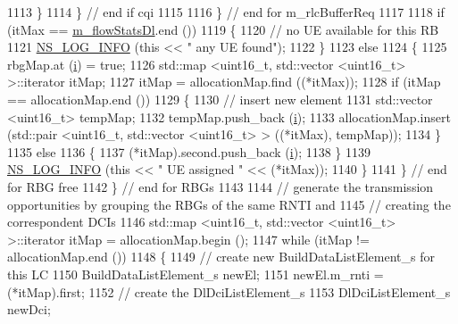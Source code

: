 \begin{DoxyCode}
1113                     \}
1114                 \}   \textcolor{comment}{// end if cqi}
1115               
1116             \} \textcolor{comment}{// end for m\_rlcBufferReq}
1117 
1118           \textcolor{keywordflow}{if} (itMax == \hyperlink{classns3_1_1TtaFfMacScheduler_ad59f8b7a0e70380e5e55053fa07a5ebc}{m\_flowStatsDl}.end ())
1119             \{
1120               \textcolor{comment}{// no UE available for this RB}
1121               \hyperlink{group__logging_gafbd73ee2cf9f26b319f49086d8e860fb}{NS\_LOG\_INFO} (\textcolor{keyword}{this} << \textcolor{stringliteral}{" any UE found"});
1122             \}
1123           \textcolor{keywordflow}{else}
1124             \{
1125               rbgMap.at (\hyperlink{bernuolliDistribution_8m_a6f6ccfcf58b31cb6412107d9d5281426}{i}) = \textcolor{keyword}{true};
1126               std::map <uint16\_t, std::vector <uint16\_t> >::iterator itMap;
1127               itMap = allocationMap.find ((*itMax));
1128               \textcolor{keywordflow}{if} (itMap == allocationMap.end ())
1129                 \{
1130                   \textcolor{comment}{// insert new element}
1131                   std::vector <uint16\_t> tempMap;
1132                   tempMap.push\_back (\hyperlink{bernuolliDistribution_8m_a6f6ccfcf58b31cb6412107d9d5281426}{i});
1133                   allocationMap.insert (std::pair <uint16\_t, std::vector <uint16\_t> > ((*itMax), tempMap));
1134                 \}
1135               \textcolor{keywordflow}{else}
1136                 \{
1137                   (*itMap).second.push\_back (\hyperlink{bernuolliDistribution_8m_a6f6ccfcf58b31cb6412107d9d5281426}{i});
1138                 \}
1139               \hyperlink{group__logging_gafbd73ee2cf9f26b319f49086d8e860fb}{NS\_LOG\_INFO} (\textcolor{keyword}{this} << \textcolor{stringliteral}{" UE assigned "} << (*itMax));
1140             \}
1141         \} \textcolor{comment}{// end for RBG free}
1142     \} \textcolor{comment}{// end for RBGs}
1143 
1144   \textcolor{comment}{// generate the transmission opportunities by grouping the RBGs of the same RNTI and}
1145   \textcolor{comment}{// creating the correspondent DCIs}
1146   std::map <uint16\_t, std::vector <uint16\_t> >::iterator itMap = allocationMap.begin ();
1147   \textcolor{keywordflow}{while} (itMap != allocationMap.end ())
1148     \{
1149       \textcolor{comment}{// create new BuildDataListElement\_s for this LC}
1150       BuildDataListElement\_s newEl;
1151       newEl.m\_rnti = (*itMap).first;
1152       \textcolor{comment}{// create the DlDciListElement\_s}
1153       DlDciListElement\_s newDci;

\end{DoxyCode}
